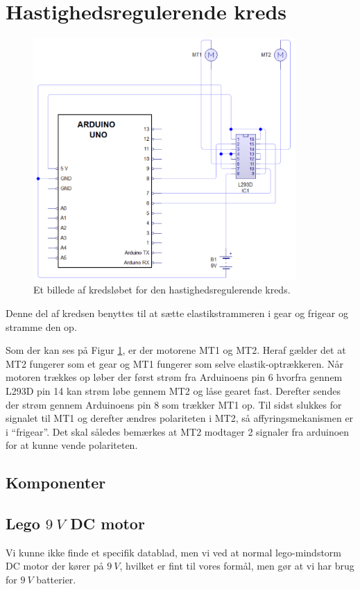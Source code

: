 \section{Hastighedsregulerende kreds}
\begin{figure}[H]	\label{kreds:hastighed}
	\centering
    \includegraphics[width=10cm]{figures/2_4kredse/hastighed.png}
	\caption{Et billede af kredsløbet for den hastighedsregulerende kreds.}
\end{figure}
Denne del af kredsen benyttes til at sætte elastikstrammeren i gear og frigear og stramme den op.

Som der kan ses på Figur \ref{kreds:hastighed}, er der motorene MT1 og MT2. Heraf gælder det at MT2 fungerer som et gear og MT1 fungerer som selve elastik-optrækkeren. Når motoren trækkes op løber der først strøm fra Arduinoens pin 6  hvorfra gennem L293D pin 14 kan strøm løbe gennem MT2 og låse gearet fast. Derefter sendes der strøm gennem Arduinoens pin 8 som trækker MT1 op. 
Til sidst slukkes for signalet til MT1 og derefter ændres polariteten i MT2, så affyringsmekanismen er i ``frigear''. Det skal således bemærkes at MT2 modtager 2 signaler fra arduinoen for at kunne vende polariteten.

\subsection{Komponenter}
\subsection{Lego $\SI{9}{V}$ DC motor}
Vi kunne ikke finde et specifik datablad, men vi ved at normal lego-mindstorm DC motor der kører på $\SI{9}{V}$, hvilket er fint til vores formål, men gør at vi har brug for $\SI{9}{V}$ batterier.

